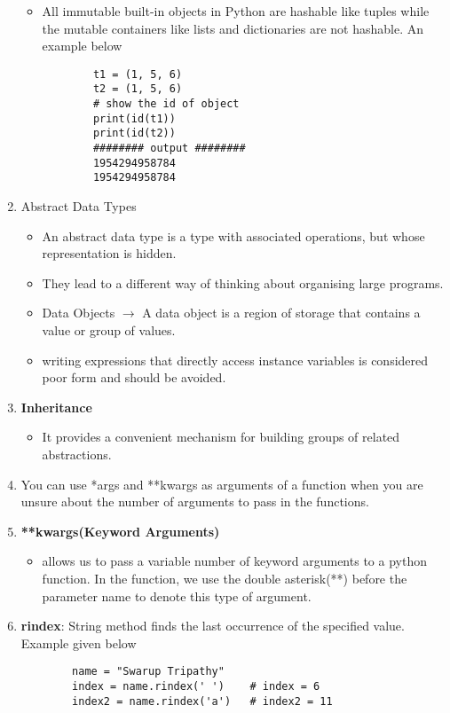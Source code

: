\documentclass[11pt]{article}
\begin{document}
\begin{enumerate}
\begin{itemize}
            \item All immutable built-in objects in Python are hashable like tuples while the mutable containers like lists and dictionaries are not hashable. An example below
            \begin{verbatim}
        t1 = (1, 5, 6)
        t2 = (1, 5, 6)
        # show the id of object
        print(id(t1))
        print(id(t2))
        ######## output ########
        1954294958784
        1954294958784
            \end{verbatim}
        \end{itemize}
        \item Abstract Data Types
        \begin{itemize}
            \item  An abstract data type is a type with associated operations, but whose representation is hidden.
            \item They lead to a different way of thinking about organising large programs.
            \item Data Objects $\rightarrow$ A data object is a region of storage that contains a value or group of values.
            \item writing expressions that directly access instance variables is considered poor form and should be avoided.
        \end{itemize}
        \item \textbf{Inheritance}
        \begin{itemize}
            \item It provides a convenient mechanism for building groups of related abstractions.
        \end{itemize}
        \item You can use *args and **kwargs as arguments of a function when you are unsure about the number of arguments to pass in the functions.
        \item \textbf{ **kwargs(Keyword Arguments)}
        \begin{itemize}
            \item allows us to pass a variable number of keyword arguments to a python function. In the function, we use the double asterisk(**) before the parameter name to denote this type of argument.
        \end{itemize}
        \item \textbf{rindex}: String method finds the last occurrence of the specified value. Example given below
        \begin{verbatim}
        name = "Swarup Tripathy"
        index = name.rindex(' ')    # index = 6
        index2 = name.rindex('a')   # index2 = 11
        \end{verbatim}
    \end{enumerate}
\end{document}
